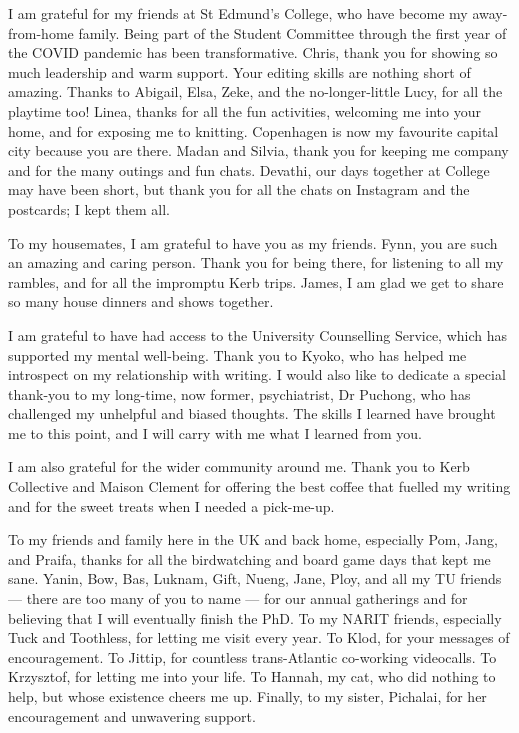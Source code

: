 \begin{acknowledgements}
I am grateful for my friends at St Edmund's College, who have become my away-from-home family. Being part of the Student Committee through the first year of the COVID pandemic has been transformative. Chris, thank you for showing so much leadership and warm support. Your editing skills are nothing short of amazing. Thanks to Abigail, Elsa, Zeke, and the no-longer-little Lucy, for all the playtime too! Linea, thanks for all the fun activities, welcoming me into your home, and for exposing me to knitting. Copenhagen is now my favourite capital city because you are there. Madan and Silvia, thank you for keeping me company and for the many outings and fun chats. Devathi, our days together at College may have been short, but thank you for all the chats on Instagram and the postcards; I kept them all. 

To my housemates, I am grateful to have you as my friends. Fynn, you are such an amazing and caring person. Thank you for being there, for listening to all my rambles, and for all the impromptu Kerb trips. James, I am glad we get to share so many house dinners and shows together.

I am grateful to have had access to the University Counselling Service, which has supported my mental well-being. Thank you to Kyoko, who has helped me introspect on my relationship with writing. I would also like to dedicate a special thank-you to my long-time, now former, psychiatrist, Dr Puchong, who has challenged my unhelpful and biased thoughts. The skills I learned have brought me to this point, and I will carry with me what I learned from you.

I am also grateful for the wider community around me. Thank you to Kerb Collective and Maison Clement for offering the best coffee that fuelled my writing and for the sweet treats when I needed a pick-me-up.

To my friends and family here in the UK and back home, especially Pom, Jang, and Praifa, thanks for all the birdwatching and board game days that kept me sane. Yanin, Bow, Bas, Luknam, Gift, Nueng, Jane, Ploy, and all my TU friends --- there are too many of you to name --- for our annual gatherings and for believing that I will eventually finish the PhD. To my NARIT friends, especially Tuck and Toothless, for letting me visit every year. To Klod, for your messages of encouragement. To Jittip, for countless trans-Atlantic co-working videocalls. To Krzysztof, for letting me into your life. To Hannah, my cat, who did nothing to help, but whose existence cheers me up. Finally, to my sister, Pichalai, for her encouragement and unwavering support.

\end{acknowledgements}
